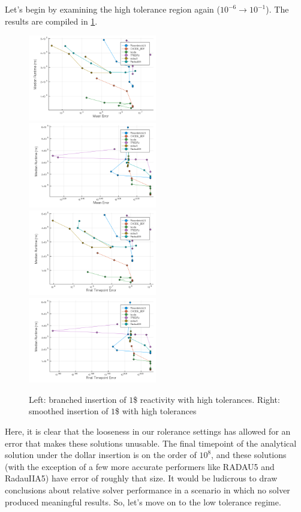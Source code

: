 \documentclass[review,onefignum,onetabnum]{siamart171218}
\begin{document}
Let's begin by examining the high tolerance region again ($10^{-6} \rightarrow 10^{-1}$).
The results are compiled in \cref{fig:high-tol-both-dollar}.
\begin{figure}
  \includegraphics[width=0.5\textwidth]{../plots/work-precision/-high_tolerance_421pcm.png}
  \includegraphics[width=0.5\textwidth]{../plots/work-precision/-high_tolerance_421pcm_tanh.png}
  \includegraphics[width=0.5\textwidth]{../plots/work-precision/final_tp-high_tolerance_421pcm.png}
  \includegraphics[width=0.5\textwidth]{../plots/work-precision/final_tp-high_tolerance_421pcm_tanh.png}
  \caption{Left: branched insertion of $1$\$ reactivity with high tolerances.
  Right: smoothed insertion of $1$\$ with high tolerances}
  \label{fig:high-tol-both-dollar}
\end{figure}
Here, it is clear that the looseness in our rolerance settings has allowed for
an error that makes these solutions unusable. The final timepoint of the analytical
solution under the dollar insertion is on the order of $10^8$, and these solutions
(with the exception of a few more accurate performers like RADAU5 and RadauIIA5)
have error of roughly that size. It would be ludicrous to draw conclusions about
relative solver performance in a scenario in which no solver produced meaningful
results. So, let's move on to the low tolerance regime. \\
\end{document}
